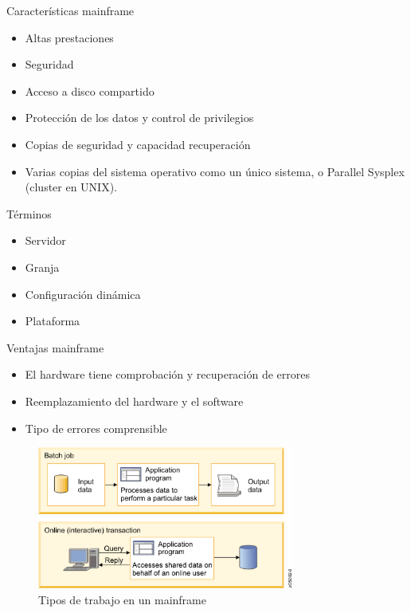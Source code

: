 \documentclass[compress]{beamer}
\begin{document}
\begin{frame}
	\begin{block}{Características mainframe}
		\begin{itemize}
			\item Altas prestaciones
			\item Seguridad
			\item Acceso a disco compartido
			\item Protección de los datos y control de privilegios
			\item Copias de seguridad y capacidad recuperación
			\item Varias copias del sistema operativo como un único sistema, o Parallel Sysplex (cluster en UNIX).
		\end{itemize}
	\end{block}
	\begin{exampleblock}{Términos}
		\begin{itemize}
			\item Servidor
			\item Granja
			\item Configuración dinámica
			\item Plataforma
		\end{itemize}
	\end{exampleblock}
\end{frame}


\begin{frame}
	\begin{block}{Ventajas mainframe}
		\begin{itemize}
			\item El hardware tiene comprobación y recuperación de errores
			\item Reemplazamiento del hardware y el software
			\item Tipo de errores comprensible
		\end{itemize}
	\end{block}
	\begin{figure}[H]
		\centering
		\label{workloads}
		\includegraphics[trim = 0mm 0mm 5mm 0mm, clip, width=0.75\textwidth]{./Imagenes/workloads.png}
		\caption{Tipos de trabajo en un mainframe}
	\end{figure}
\end{frame}
\end{document}
